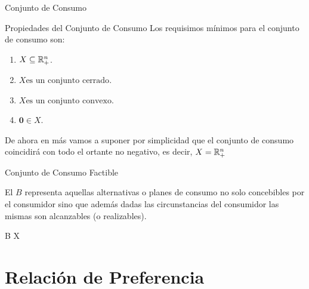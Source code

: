\documentclass[10pt,aspectratio=169]{beamer}  %
\begin{document}
\begin{frame}{Conjunto de Consumo}
	\begin{alertblock}{Propiedades del Conjunto de Consumo}
    Los requisimos mínimos para el conjunto de consumo son:

    \begin{enumerate}
      \item $X \subseteq \mathbb{R}^{n}_{+}$.
      \item $X \text{es un conjunto cerrado}$.
      \item $X \text{es un conjunto convexo}$.
      \item $\mathbf{0} \in X$.
  \end{enumerate}
  \end{alertblock}
  \vspace{8pt}

  De ahora en más vamos a suponer por simplicidad que el conjunto de consumo coincidirá con todo
  el ortante no negativo, es decir, $X = \mathbb{R}^{n}_{+}$
\end{frame}

\begin{frame}{Conjunto de Consumo Factible}
	
  El  $B$ representa aquellas alternativas o planes de consumo no solo 
  concebibles por el consumidor sino que además dadas las circunstancias del consumidor las mismas
  son alcanzables (o realizables).

  \begin{myequation}
    B \subset X
  \end{myequation}

\end{frame}


\section{Relación de Preferencia}
\end{document}
